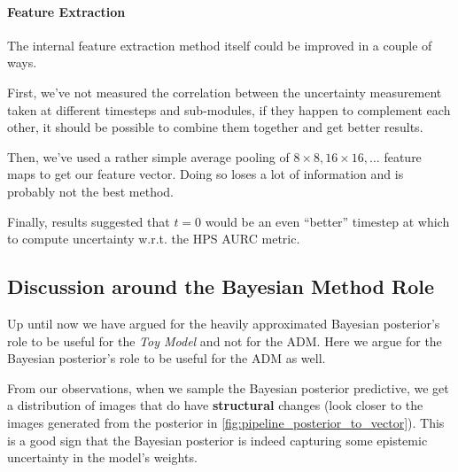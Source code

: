 \paragraph{Feature Extraction}

The internal feature extraction method itself could be improved in a couple of ways. 

First, we've not measured the correlation between the uncertainty measurement taken at different timesteps and sub-modules, if they happen to complement each other, it should be possible to combine them together and get better results.

Then, we've used a rather simple average pooling of $8\times8, 16 \times 16, \dots$ feature maps to get our feature vector. Doing so loses a lot of information and is probably not the best method.

Finally, results suggested that $t=0$ would be an even ``better'' timestep at which to compute uncertainty w.r.t. the \acs{HPS} \acs{AURC} metric.


\subsection{Discussion around the Bayesian Method Role}

Up until now we have argued for the heavily approximated Bayesian posterior's role to be useful for the \textit{Toy Model} and not for the \acs{ADM}. Here we argue for the Bayesian posterior's role to be useful for the \acs{ADM} as well.

From our observations, when we sample the Bayesian posterior predictive, we get a distribution of images that do have \textbf{structural} changes (look closer to the images generated from the posterior in \autoref{fig:pipeline_posterior_to_vector}). This is a good sign that the Bayesian posterior is indeed capturing some epistemic uncertainty in the model's weights. 

